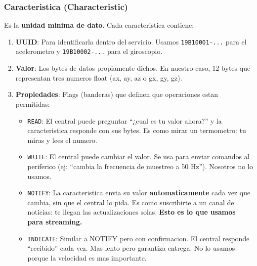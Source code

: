 \documentclass[11pt,a4paper]{article}
\begin{document}
\subsubsection{Caracteristica (Characteristic)}

Es la \textbf{unidad minima de dato}. Cada caracteristica contiene:

\begin{enumerate}
    \item \textbf{UUID}: Para identificarla dentro del servicio.
          Usamos \texttt{19B10001-...} para el acelerometro y
          \texttt{19B10002-...} para el giroscopio.

    \item \textbf{Valor}: Los bytes de datos propiamente dichos. En
          nuestro caso, 12 bytes que representan tres numeros float
          (ax, ay, az o gx, gy, gz).

    \item \textbf{Propiedades}: Flags (banderas) que definen que
          operaciones estan permitidas:

    \begin{itemize}
        \item \texttt{READ}: El central puede preguntar
              ``¿cual es tu valor ahora?'' y la caracteristica
              responde con sus bytes. Es como mirar un termometro:
              tu miras y lees el numero.

        \item \texttt{WRITE}: El central puede cambiar el valor. Se
              usa para enviar comandos al periferico (ej: ``cambia
              la frecuencia de muestreo a 50 Hz''). Nosotros no lo
              usamos.

        \item \texttt{NOTIFY}: La caracteristica envia su valor
              \textbf{automaticamente} cada vez que cambia, sin que
              el central lo pida. Es como suscribirte a un canal de
              noticias: te llegan las actualizaciones solas.
              \textbf{Esto es lo que usamos para streaming.}

        \item \texttt{INDICATE}: Similar a NOTIFY pero con
              confirmacion. El central responde ``recibido'' cada vez.
              Mas lento pero garantiza entrega. No lo usamos porque
              la velocidad es mas importante.
    \end{itemize}
\end{enumerate}
\end{document}
